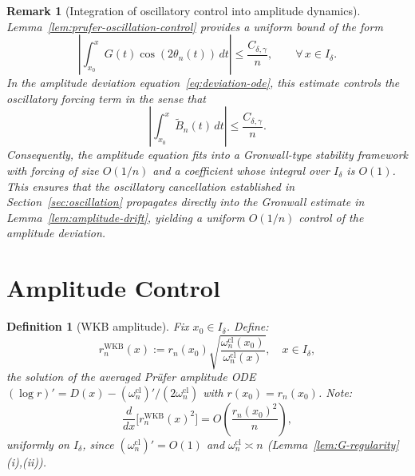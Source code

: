 \documentclass[12pt,a4paper]{amsart}
\newtheorem{definition}[theorem]{Definition}
\newtheorem{remark}[theorem]{Remark}
\newcommand{\wncl}{\omega_n^{\mathrm{cl}}}
\begin{document}
\begin{remark}[Integration of oscillatory control into amplitude dynamics]
\label{rem:osc-gronwall-link}
Lemma~\ref{lem:prufer-oscillation-control} provides a uniform
bound of the form
\[
  \left|
    \int_{x_0}^{x} G(t)\cos(2\theta_n(t))\,dt
  \right|
  \le \frac{C_{\delta,\gamma}}{n},
  \qquad \forall\, x \in I_\delta.
\]
In the amplitude deviation equation~\eqref{eq:deviation-ode},
this estimate controls the oscillatory forcing term in the sense
that
\[
  \left|
    \int_{x_0}^{x} \widetilde{B}_n(t)\,dt
  \right|
  \le \frac{C_{\delta,\gamma}}{n}.
\]
Consequently, the amplitude equation fits into a Gronwall-type
stability framework with forcing of size $O(1/n)$ and a
coefficient whose integral over $I_\delta$ is $O(1)$.
This ensures that the oscillatory cancellation established in
Section~\ref{sec:oscillation} propagates directly into the
Gronwall estimate in Lemma~\ref{lem:amplitude-drift},
yielding a uniform $O(1/n)$ control of the amplitude deviation.
\end{remark}

\section{Amplitude Control}\label{sec:amplitude}

\begin{definition}[WKB amplitude]\label{def:wkb-amp}
Fix $x_0 \in I_\delta$. Define:
\begin{equation}\label{eq:wkb-amp}
  r_n^{\mathrm{WKB}}(x)
  := r_n(x_0)\sqrt{\frac{\wncl(x_0)}{\wncl(x)}},
  \quad x \in I_\delta,
\end{equation}
the solution of the averaged Pr\"ufer amplitude ODE
$(\log r)' = D(x) - (\wncl)'/(2\wncl)$
with $r(x_0) = r_n(x_0)$.
Note:
\begin{equation}\label{eq:wkb-amp-deriv}
  \frac{d}{dx}\bigl[r_n^{\mathrm{WKB}}(x)^2\bigr]
  = O\!\left(\frac{r_n(x_0)^2}{n}\right),
\end{equation}
uniformly on $I_\delta$,
since $(\wncl)' = O(1)$ and $\wncl \asymp n$
(Lemma~\ref{lem:G-regularity}(i),(ii)).
\end{definition}
\end{document}
